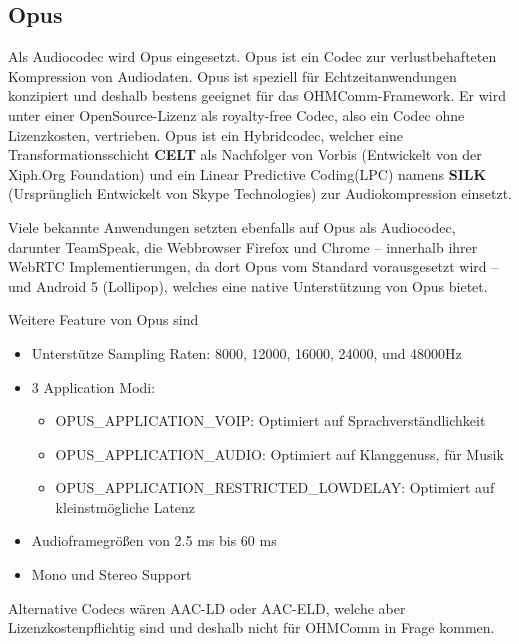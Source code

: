 \subsection{Opus}

Als Audiocodec wird Opus \cite{Opus} eingesetzt. Opus ist ein Codec zur verlustbehafteten Kompression von Audiodaten. Opus ist speziell für Echtzeitanwendungen konzipiert und deshalb bestens geeignet für das OHMComm-Framework. Er wird unter einer OpenSource-Lizenz als royalty-free Codec, also ein Codec ohne Lizenzkosten, vertrieben. Opus ist ein Hybridcodec, welcher eine Transformationsschicht \textbf{CELT} als Nachfolger von Vorbis (Entwickelt von der Xiph.Org Foundation) \cite{CELT} und ein Linear Predictive Coding(LPC) namens \textbf{SILK} (Ursprünglich Entwickelt von Skype Technologies) \cite{SILK} zur Audiokompression einsetzt.

Viele bekannte Anwendungen setzten ebenfalls auf Opus als Audiocodec, darunter TeamSpeak, die Webbrowser Firefox und Chrome  -- innerhalb ihrer WebRTC Implementierungen, da dort Opus vom Standard vorausgesetzt wird \cite[Abschnitt 3]{WebRTC:Opus} -- und Android 5 (Lollipop), welches eine native Unterstützung von Opus bietet.

Weitere Feature von Opus sind

\begin{itemize}
\label{Opus Sample Rate}
\item Unterstütze Sampling Raten: 8000, 12000, 16000, 24000, und 48000Hz
\item 3 Application Modi:
\begin{itemize}
\label{Opus Application Modi}
\item OPUS\_APPLICATION\_VOIP: Optimiert auf Sprachverständlichkeit
\item OPUS\_APPLICATION\_AUDIO: Optimiert auf Klanggenuss, für Musik
\item OPUS\_APPLICATION\_RESTRICTED\_LOWDELAY: Optimiert auf kleinstmögliche Latenz
\end{itemize}
\label{Opus Audioframe}
\item Audioframegrößen von 2.5 ms bis 60 ms
\item Mono und Stereo Support
\end{itemize}

Alternative Codecs wären AAC-LD oder AAC-ELD, welche aber Lizenzkostenpflichtig sind und deshalb nicht für OHMComm in Frage kommen.

